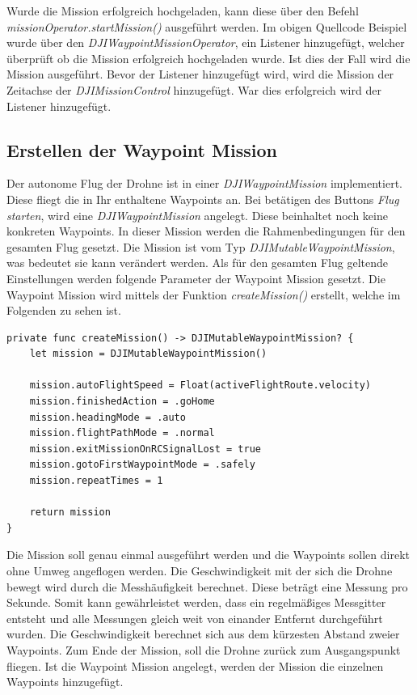 Wurde die Mission erfolgreich hochgeladen, kann diese über den Befehl \textit{missionOperator.startMission()} ausgeführt werden. Im obigen Quellcode Beispiel wurde über den \textit{DJIWaypointMissionOperator}, ein Listener hinzugefügt, welcher überprüft ob die Mission erfolgreich hochgeladen wurde. Ist dies der Fall wird die Mission ausgeführt. 
\newline 
Bevor der Listener hinzugefügt wird, wird die Mission der Zeitachse der \textit{DJIMissionControl} hinzugefügt. War dies erfolgreich wird der Listener hinzugefügt.

\subsection{Erstellen der Waypoint Mission}
Der autonome Flug der Drohne ist in einer \textit{DJIWaypointMission} implementiert. Diese fliegt die in Ihr enthaltene Waypoints an. 
\newline
Bei betätigen des Buttons \textit{Flug starten}, wird eine \textit{DJIWaypointMission} angelegt. Diese beinhaltet noch keine konkreten Waypoints. In dieser Mission werden die Rahmenbedingungen für den gesamten Flug gesetzt. Die Mission ist vom Typ \textit{DJIMutableWaypointMission}, was bedeutet sie kann verändert werden.
\newline
Als für den gesamten Flug geltende Einstellungen werden folgende Parameter der Waypoint Mission gesetzt. Die Waypoint Mission wird mittels der Funktion \textit{createMission()} erstellt, welche im Folgenden zu sehen ist.
\newline
\begin{lstlisting}[caption=Erstellen einer Waypoint Mission]
private func createMission() -> DJIMutableWaypointMission? {
	let mission = DJIMutableWaypointMission()

	mission.autoFlightSpeed = Float(activeFlightRoute.velocity)
	mission.finishedAction = .goHome
	mission.headingMode = .auto
	mission.flightPathMode = .normal
	mission.exitMissionOnRCSignalLost = true
	mission.gotoFirstWaypointMode = .safely
	mission.repeatTimes = 1

	return mission
}
\end{lstlisting}
Die Mission soll genau einmal ausgeführt werden und die Waypoints sollen direkt ohne Umweg angeflogen werden. Die Geschwindigkeit mit der sich die Drohne bewegt wird durch die Messhäufigkeit berechnet. Diese beträgt eine Messung pro Sekunde. Somit kann gewährleistet werden, dass ein regelmäßiges Messgitter entsteht und alle Messungen gleich weit von einander Entfernt durchgeführt wurden. 
\newline
Die Geschwindigkeit berechnet sich aus dem kürzesten Abstand zweier Waypoints. 
\newline
Zum Ende der Mission, soll die Drohne zurück zum Ausgangspunkt fliegen.
\newline
Ist die Waypoint Mission angelegt, werden der Mission die einzelnen Waypoints hinzugefügt. 

